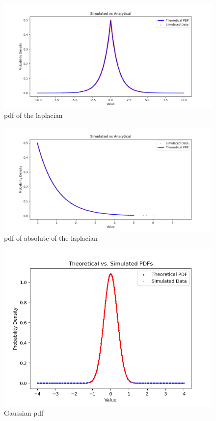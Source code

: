 \documentclass[journal,12pt,twocolumn]{IEEEtran}
\begin{document}
\begin{figure}[ht]
\includegraphics[width=\columnwidth]{2023/ST/61/figs/Figure_1.png}
\caption{pdf of the laplacian}
\label{fig:2023/ST/61/1}
\end{figure}
\begin{figure}[ht]
\includegraphics[width=\columnwidth]{2023/ST/61/figs/Figure_2.png}
\caption{pdf of absolute of the laplacian}
\label{fig:2023/ST/61/2}
\end{figure}
\begin{figure}[ht]
\includegraphics[width=\columnwidth]{2023/ST/61/figs/Figure_3.png}
\caption{Gaussian pdf}
\label{fig:2023/ST/61/3}
\end{figure}
\end{document}
